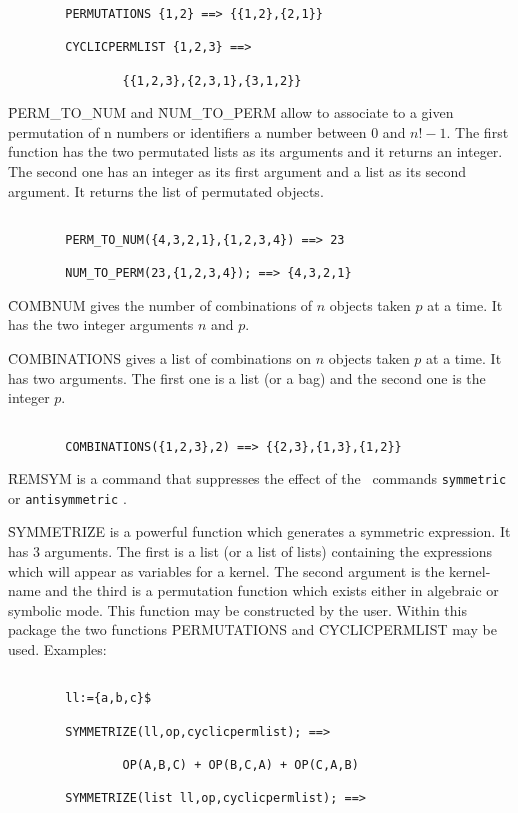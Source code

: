 \begin{itemize}
\begin{verbatim}
        PERMUTATIONS {1,2} ==> {{1,2},{2,1}}

        CYCLICPERMLIST {1,2,3} ==>

                {{1,2,3},{2,3,1},{3,1,2}}

\end{verbatim}
\f{PERM\_TO\_NUM} and \f{NUM\_TO\_PERM} allow to associate to a given 
permutation of n numbers or identifiers a number between $0$ and 
$n! - 1$. The first function has the two permutated lists  
as its arguments and it returns an integer. The second one has an integer  
as its first argument and a list as its second argument. It returns the 
list of permutated objects.
\begin{verbatim}

        PERM_TO_NUM({4,3,2,1},{1,2,3,4}) ==> 23

        NUM_TO_PERM(23,{1,2,3,4}); ==> {4,3,2,1}

\end{verbatim}
\f{COMBNUM} gives the number of combinations of $n$ objects
taken $p$ at a time. It has the two integer arguments $n$ and $p$.

\f{COMBINATIONS} gives a list of combinations on $n$ objects taken $p$
at a time. It has two arguments. The first one is a list (or a bag) and
the second one is the integer $p$.
\begin{verbatim}

        COMBINATIONS({1,2,3},2) ==> {{2,3},{1,3},{1,2}}

\end{verbatim}
\f{REMSYM} is a command that suppresses the effect of the \REDUCE\ commands
\verb+symmetric+ or \verb+antisymmetric+ .

\f{SYMMETRIZE} is a powerful function which generates a symmetric expression.
It has 3 arguments. The first is a list (or a list of lists) containing
the expressions which will appear as variables for a kernel. The second
argument is the kernel-name and the third is a permutation function
which exists either in algebraic or symbolic mode. This
function may be constructed by the user. Within this package
the two functions \f{PERMUTATIONS} and \f{CYCLICPERMLIST} may be used.
Examples:
\begin{verbatim}

        ll:={a,b,c}$

        SYMMETRIZE(ll,op,cyclicpermlist); ==>

                OP(A,B,C) + OP(B,C,A) + OP(C,A,B)

        SYMMETRIZE(list ll,op,cyclicpermlist); ==>


\end{verbatim}
\end{itemize}

